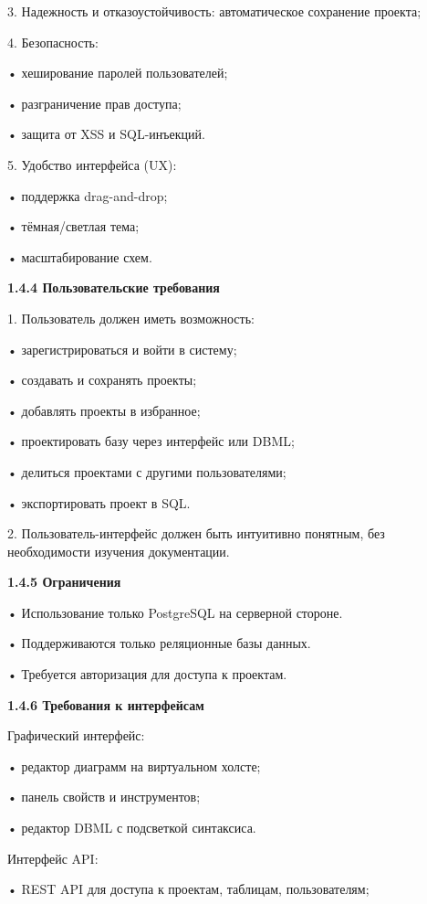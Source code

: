 	3.	Надежность и отказоустойчивость: автоматическое сохранение проекта;
    
	4.	Безопасность:
    
	•	хеширование паролей пользователей;
    
	•	разграничение прав доступа;
    
	•	защита от XSS и SQL-инъекций.
    
	5.	Удобство интерфейса (UX):
    
	•	поддержка drag-and-drop;
    
	•	тёмная/светлая тема;
    
	•	масштабирование схем.

\textbf{\large 1.4.4 Пользовательские требования }

	1.	Пользователь должен иметь возможность:
    
	•	зарегистрироваться и войти в систему;
    
	•	создавать и сохранять проекты;
    
	•	добавлять проекты в избранное;
    
	•	проектировать базу через интерфейс или DBML;
    
	•	делиться проектами с другими пользователями;
    
	•	экспортировать проект в SQL.
    
	2.	Пользователь-интерфейс должен быть интуитивно понятным, без необходимости изучения документации.

\textbf{\large 1.4.5 Ограничения}

	•	Использование только PostgreSQL на серверной стороне.
    
	•	Поддерживаются только реляционные базы данных.
    
	•	Требуется авторизация для доступа к проектам.


\textbf{\large 1.4.6 Требования к интерфейсам}

	Графический интерфейс:
    
	•	редактор диаграмм на виртуальном холсте;
    
	•	панель свойств и инструментов;
    
	•	редактор DBML с подсветкой синтаксиса.
    
	Интерфейс API:
    
	•	REST API для доступа к проектам, таблицам, пользователям;
    
